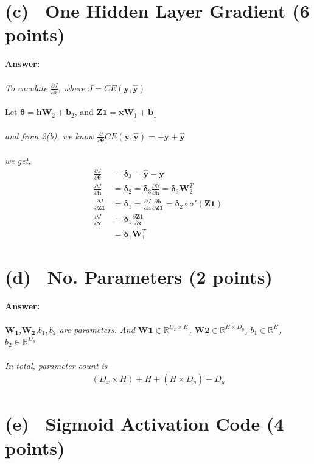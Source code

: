 \documentclass[fleqn]{MJD}
\newcommand{\subproblem}[2]{\section{(#1)~ #2}}
\newcommand{\0}{\emptyset}
\begin{document}
\newpage

\subproblem{c}{One Hidden Layer Gradient (6 points)}

\noindent \textbf{Answer:} \\
\\
\noindent \textit{To caculate $\frac{\partial J}{\partial x}$, where $J= CE(\mathbf{y}, \hat{\mathbf{y}})$ } \\
\\
\noindent Let $\bm{\theta}=\bm{hW}_{2} + \bm{b}_{2}$, and $\bm{Z1}=\bm{xW}_{1} + \bm{b}_{1}$ \\
\\
\noindent \textit{and from 2(b), we know $\frac{\partial}{\partial \bm{\theta}}CE(\mathbf{y}, \hat{\mathbf{y}})= -  \bm{y} + \bm{\hat{y}}$} \\
\\
\noindent \textit{we get, }
\begin{align}
	\frac{\partial J}{\partial \bm{\theta}} %
		&= \bm{\delta}_{3} = \hat{\bm{y}} - \bm{y} \nonumber \\
	\frac{\partial J}{\partial \bm{h}} %
		&= \bm{\delta}_{2} = \bm{\delta}_{3} \frac{\partial \bm{\theta}}{\partial \bm{h}}= \bm{\delta}_{3}\bm{W}_{2}^{T} \nonumber \\
	\frac{\partial J}{\partial \bm{Z1}} %
			&= \bm{\delta}_{1} = \frac{\partial J}{\partial \bm{h}} \frac{\partial \bm{h}}{\partial \bm{Z1}} = \bm{\delta}_{2} \circ \sigma'(\bm{Z1}) \nonumber \\
	\frac{\partial J}{\partial \bm{x}} %
		&= \bm{\delta}_{1} \frac{\partial \bm{Z1}}{\partial \bm{x}} \nonumber \\
		&= \bm{\delta}_{1}  \bm{W}_{1}^{T} \nonumber
\end{align}

\subproblem{d}{No. Parameters (2 points)}

\noindent \textbf{Answer:} \\
\\
\textit {$\bm{W_{1}}$,$\bm{W_{2}}$,$b_{1},b_{2}$ are parameters. And $\bm{W1} \in \mathbb{R}^{D_{x} \times H}$, $\bm{W2} \in \mathbb{R}^{H \times D_{y}}$, $b_{1} \in \mathbb{R}^{H}$, $b_{2} \in \mathbb{R}^{D_{y}}$} \\
\\
\textit {In total, parameter count is}
\begin{align}
	(D_{x} \times H) + H + (H \times D_{y}) + D_{y} \nonumber
\end{align}

\subproblem{e}{Sigmoid Activation Code (4 points)}
\end{document}
